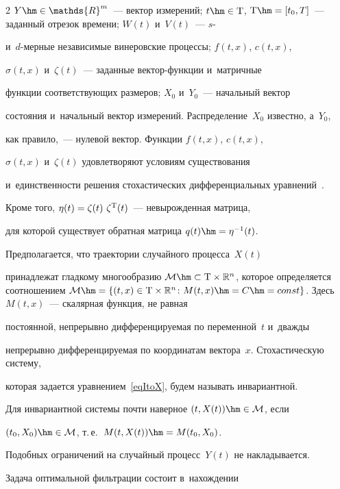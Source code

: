 \begin{multicols}{2}
$Y \hm\in \mathds{R}^m$~--- вектор измерений; $t \hm\in \mathrm{T}$, $\mathrm{T}\hm = 

[t_0,T]$~--- заданный отрезок времени; $W(t)$ и~$V(t)$~--- $s$- 

и~$d$-мер\-ные независимые винеровские процессы; $f(t,x)$, $c(t,x)$,

 $\sigma(t,x)$ и~$\zeta(t)$~--- заданные век\-тор-функ\-ции и~матричные 

 функции соответствующих размеров; $X_0$ и~$Y_0$~--- начальный вектор 

 состояния и~начальный вектор измерений. Распределение~$X_0$ известно, а~$Y_0$, 

 как правило,~--- нулевой вектор. Функции $f(t,x)$, $c(t,x)$, 

 $\sigma(t,x)$ и~$\zeta(t)$ удовлетворяют условиям существования 

 и~единственности решения стохастических дифференциальных уравнений~\cite{OksSul_05}. 

 Кроме того, $\eta(t) = \zeta(t) \  \zeta^{{\mathrm{T}}}(t)$~--- не\-вы\-рож\-ден\-ная мат\-ри\-ца, 

 для которой существует обратная матрица $q(t) \hm= \eta^{-1}(t)$.



Предполагается, что траектории случайного процесса~$X(t)$ 

принадлежат гладкому многообразию $\mathcal{M} \hm\subset \mathrm{T} \times 

\mathbb{R}^n$, которое определяется соотношением $\mathcal{M} \hm= 

\{(t,x) \in \mathrm{T} \times \mathbb{R}^n \colon M(t,x) \hm= C \hm= 

{const}\}$. Здесь $M(t,x)$~--- скалярная функция, не равная 

постоянной, непрерывно дифференцируемая по переменной~$t$ и~дважды 

непрерывно дифференцируемая по координатам вектора~$x$. Стохастическую систему, 

которая задается уравнением~\eqref{eqItoX}, будем называть инвариантной. 

Для инвариантной системы почти наверное $(t,X(t)) \hm\in \mathcal{M}$, если 

$(t_0,X_0)\hm \in \mathcal{M}$, т.\,е.\ $M(t,X(t))\hm = M(t_0,X_0)$. 

Подобных ограничений на случайный процесс~$Y(t)$ не накладывается.



Задача оптимальной фильтрации состоит в~нахождении 


\end{multicols}
